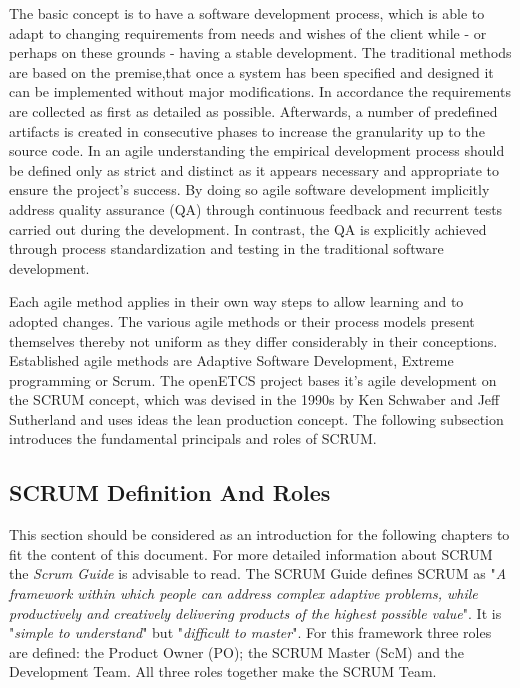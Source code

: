 The basic concept is to have a software development process, which is able to adapt to changing requirements from needs and wishes of the client while - or perhaps on these grounds - having a stable development. The traditional methods are based on the premise,that once a system has been specified and designed it can be implemented without major modifications. In accordance the requirements are collected as first as detailed as possible. Afterwards, a number of predefined artifacts is created in consecutive phases to increase the granularity up to the source code. In an agile understanding the empirical development process should be defined only as strict and distinct as it appears necessary and appropriate to ensure the project's success. By doing so agile software development implicitly address quality assurance (QA) through  continuous feedback and recurrent tests carried out during the development. In contrast, the QA is explicitly achieved through process standardization and testing in the traditional software development.

Each agile method applies in their own way steps to allow learning and to adopted changes. The various agile methods or their process models present themselves thereby not uniform as they differ considerably in their conceptions. Established agile methods are Adaptive Software Development, Extreme programming or Scrum. The openETCS project bases it's agile development on the SCRUM concept, which was devised in the 1990s by Ken Schwaber and Jeff Sutherland and uses ideas the lean production concept. The following subsection introduces the fundamental principals and roles of SCRUM.


\subsection{SCRUM Definition And Roles}

This section should be considered as an introduction for the following chapters to fit the content of this document. For more detailed information about SCRUM the \textit{Scrum Guide} is advisable to read. The SCRUM Guide defines SCRUM as "\textit{A framework within which people can address complex adaptive problems, while productively and creatively delivering products of the highest possible value}". It is "\textit{simple to understand}" but "\textit{difficult to master}". For this framework three roles are defined: the Product Owner (PO); the SCRUM Master (ScM) and the Development Team. All three roles together make the SCRUM Team.

